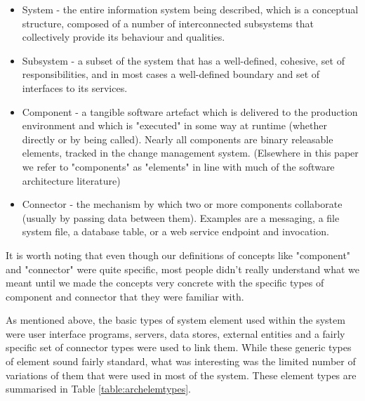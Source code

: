 \begin{itemize}
\item System - the entire information system being described, which is a conceptual structure, composed of a number of interconnected subsystems that collectively provide its behaviour and qualities.

\item Subsystem - a subset of the system that has a well-defined, cohesive, set of responsibilities, and in most cases a well-defined boundary and set of interfaces to its services.

\item Component - a tangible software artefact which is delivered to the production environment and which is "executed" in some way at runtime (whether directly or by being called). Nearly all components are binary releasable elements, tracked in the change management system. (Elsewhere in this paper we refer to "components" as "elements" in line with much of the software architecture literature)

\item Connector - the mechanism by which two or more components collaborate (usually by passing data between them).  Examples are a messaging, a file system file, a database table, or a web service endpoint and invocation.

\end{itemize}

  It is worth noting that even though our definitions of concepts like "component" and "connector" were quite specific, most people didn't really understand what we meant until we made the concepts very concrete with the specific types of component and connector that they were familiar with.

  As mentioned above, the basic types of system element used within the system were user interface programs, servers, data stores, external entities and a fairly specific set of connector types were used to link them.  While these generic types of element sound fairly standard, what was interesting was the limited number of variations of them that were used in most of the system.  These element types are summarised in Table \ref{table:archelemtypes}.

